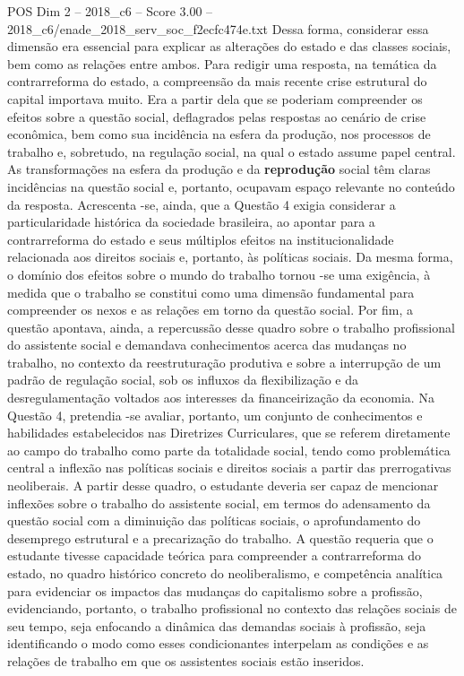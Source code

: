 \begin{textsample}{POS Dim 2 – 2018\_c6 – Score 3.00 – 2018\_c6/enade\_2018\_serv\_soc\_f2ecfc474e.txt}
Dessa forma, considerar essa dimensão era essencial para explicar as alterações do estado e das classes sociais, bem como as relações entre ambos.
Para redigir uma resposta, na temática da contrarreforma do estado, a compreensão da mais recente crise estrutural do capital importava muito.
Era a partir dela que se poderiam compreender os efeitos sobre a questão social, deflagrados pelas respostas ao cenário de crise econômica, bem como sua incidência na esfera da produção, nos processos de trabalho e, sobretudo, na regulação social, na qual o estado assume papel central.
As transformações na esfera da produção e da \textbf{reprodução} social têm claras incidências na questão social e, portanto, ocupavam espaço relevante no conteúdo da resposta.
Acrescenta -se, ainda, que a Questão 4 exigia considerar a particularidade histórica da sociedade brasileira, ao apontar para a contrarreforma do estado e seus múltiplos efeitos na institucionalidade relacionada aos direitos sociais e, portanto, às políticas sociais.
Da mesma forma, o domínio dos efeitos sobre o mundo do trabalho tornou -se uma exigência, à medida que o trabalho se constitui como uma dimensão fundamental para compreender os nexos e as relações em torno da questão social.
Por fim, a questão apontava, ainda, a repercussão desse quadro sobre o trabalho profissional do assistente social e demandava conhecimentos acerca das mudanças no trabalho, no contexto da reestruturação produtiva e sobre a interrupção de um padrão de regulação social, sob os influxos da flexibilização e da desregulamentação voltados aos interesses da financeirização da economia.
Na Questão 4, pretendia -se avaliar, portanto, um conjunto de conhecimentos e habilidades estabelecidos nas Diretrizes Curriculares, que se referem diretamente ao campo do trabalho como parte da totalidade social, tendo como problemática central a inflexão nas políticas sociais e direitos sociais a partir das prerrogativas neoliberais.
A partir desse quadro, o estudante deveria ser capaz de mencionar inflexões sobre o trabalho do assistente social, em termos do adensamento da questão social com a diminuição das políticas sociais, o aprofundamento do desemprego estrutural e a precarização do trabalho.
A questão requeria que o estudante tivesse capacidade teórica para compreender a contrarreforma do estado, no quadro histórico concreto do neoliberalismo, e competência analítica para evidenciar os impactos das mudanças do capitalismo sobre a profissão, evidenciando, portanto, o trabalho profissional no contexto das relações sociais de seu tempo, seja enfocando a dinâmica das demandas sociais à profissão, seja identificando o modo como esses condicionantes interpelam as condições e as relações de trabalho em que os assistentes sociais estão inseridos.

\end{textsample}
